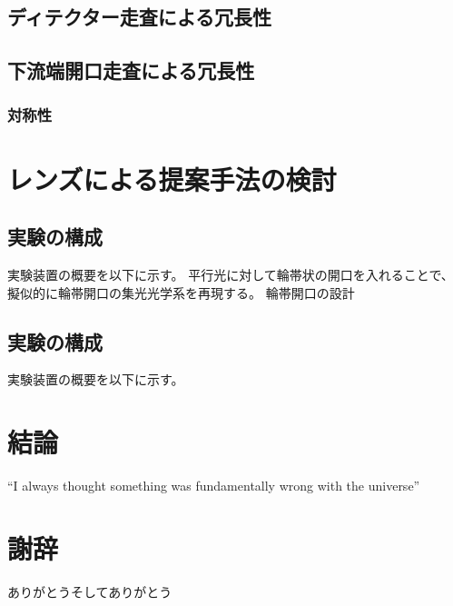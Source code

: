 \documentclass[dvipdfmx,autodetect-engine]{jreport}
\begin{document}
\section{ディテクター走査による冗長性}

\section{下流端開口走査による冗長性}

\subsection{対称性}

\newpage
\chapter{レンズによる提案手法の検討}

\newpage

\section{実験の構成}
実験装置の概要を以下に示す。
平行光に対して輪帯状の開口を入れることで、擬似的に輪帯開口の集光光学系を再現する。
輪帯開口の設計

\section{実験の構成}
実験装置の概要を以下に示す。


\newpage
\chapter{結論}
``I always thought something was fundamentally wrong with the universe'' \citep{adams1995hitchhiker}

\newpage
\chapter{謝辞}
ありがとうそしてありがとう



\end{document}
